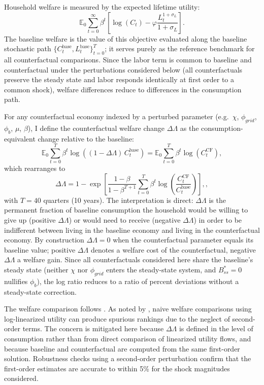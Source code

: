	Household welfare is measured by the expected lifetime utility:
	\begin{equation}
		\mathbb{E}_0 \sum_{t=0}^{\infty} \beta^t \left[ \log(C_t) - \varphi \frac{L_t^{1+\sigma_L}}{1+\sigma_L} \right].
	\end{equation}
	The baseline welfare is the value of this objective evaluated along the baseline stochastic path $\{C_t^{\text{base}}, L_t^{\text{base}}\}_{t=0}^{T}$; it serves purely as the reference benchmark for all counterfactual comparisons. Since the labor term is common to baseline and counterfactual under the perturbations considered below (all counterfactuals preserve the steady state and labor responds identically at first order to a common shock), welfare differences reduce to differences in the consumption path.

	For any counterfactual economy indexed by a perturbed parameter (e.g.\ $\chi$, $\phi_{grid}$, $\phi_b$, $\mu$, $\beta$), I define the counterfactual welfare change $\Delta\Lambda$ as the consumption-equivalent change relative to the baseline:
	\begin{equation}
		\mathbb{E}_0 \sum_{t=0}^{T} \beta^t \log\!\left((1-\Delta\Lambda)\,C_t^{\text{base}}\right) = \mathbb{E}_0 \sum_{t=0}^{T} \beta^t \log(C_t^{\text{CF}})
		\label{eq:welfare_change_defn},
	\end{equation}
	which rearranges to
	\begin{equation}
		\Delta\Lambda = 1 - \exp\!\left[\frac{1-\beta}{1-\beta^{T+1}} \sum_{t=0}^{T} \beta^t \log\!\left(\frac{C_t^{\text{CF}}}{C_t^{\text{base}}}\right)\right],
		\label{eq:welfare_change},
	\end{equation}
	with $T = 40$ quarters (10 years). The interpretation is direct: $\Delta\Lambda$ is the permanent fraction of baseline consumption the household would be willing to give up (positive $\Delta\Lambda$) or would need to receive (negative $\Delta\Lambda$) in order to be indifferent between living in the baseline economy and living in the counterfactual economy. By construction $\Delta\Lambda = 0$ when the counterfactual parameter equals its baseline value; positive $\Delta\Lambda$ denotes a welfare cost of the counterfactual, negative $\Delta\Lambda$ a welfare gain. Since all counterfactuals considered here share the baseline's steady state (neither $\chi$ nor $\phi_{grid}$ enters the steady-state system, and $B^*_{ss}=0$ nullifies $\phi_b$), the log ratio reduces to a ratio of percent deviations without a steady-state correction.

	The welfare comparison follows \citet{lucas1987}. As noted by \citet{kim2003}, naive welfare comparisons using log-linearized utility can produce spurious rankings due to the neglect of second-order terms. The concern is mitigated here because $\Delta\Lambda$ is defined in the level of consumption rather than from direct comparison of linearized utility flows, and because baseline and counterfactual are computed from the same first-order solution. Robustness checks using a second-order perturbation confirm that the first-order estimates are accurate to within 5\% for the shock magnitudes considered.

